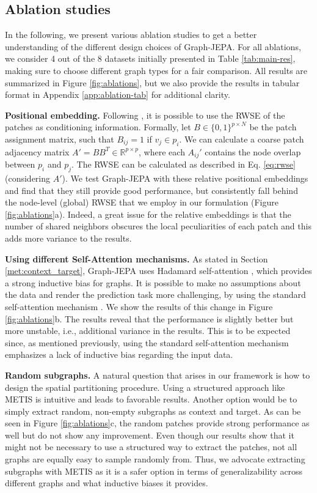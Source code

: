 \documentclass{article} \usepackage{iclr2024_conference,times}
\begin{document}
\subsection{Ablation studies}
In the following, we present various ablation studies to get a better understanding of the different design choices of Graph-JEPA. For all ablations, we consider 4 out of the 8 datasets initially presented in Table \ref{tab:main-res}, making sure to choose different graph types for a fair comparison. All results are summarized in Figure \ref{fig:ablations}, but we also provide the results in tabular format in Appendix \ref{app:ablation-tab} for additional clarity.

\textbf{Positional embedding.} Following \citet{he2023generalization}, it is possible to use the RWSE of the patches as conditioning information. Formally, let $B \in \{0,1\}^{p \times N}$ be the patch assignment matrix, such that $B_{ij} = 1$ if $v_j \in p_i$. We can calculate a coarse patch adjacency matrix $A' = BB^T \in \mathbb{R}^{p \times p}$, where each $A_{ij}'$ contains the node overlap between $p_i$ and $p_j$. The RWSE can be calculated as described in Eq. \ref{eq:rwse} (considering $A'$). We test Graph-JEPA with these relative positional embeddings and find that they still provide good performance, but consistently fall behind the node-level (global) RWSE that we employ in our formulation (Figure \ref{fig:ablations}a). Indeed, a great issue for the relative embeddings is that the number of shared neighbors obscures the local peculiarities of each patch and this adds more variance to the results. 

\textbf{Using different Self-Attention mechanisms.} As stated in Section \ref{met:context_target}, Graph-JEPA uses Hadamard self-attention \citep{he2023generalization}, which provides a strong inductive bias for graphs. It is possible to make no assumptions about the data and render the prediction task more challenging, by using the standard self-attention mechanism \citep{vaswani2017attention}. We show the results of this change in Figure \ref{fig:ablations}b. The results reveal that the performance is slightly better but more unstable, i.e., additional variance in the results. This is to be expected since, as mentioned previously, using the standard self-attention mechanism emphasizes a lack of inductive bias regarding the input data.

\textbf{Random subgraphs.} A natural question that arises in our framework is how to design the spatial partitioning procedure. Using a structured approach like METIS is intuitive and leads to favorable results. Another option would be to simply extract random, non-empty subgraphs as context and target. As can be seen in Figure \ref{fig:ablations}c, the random patches provide strong performance as well but do not show any improvement. Even though our results show that it might not be necessary to use a structured way to extract the patches, not all graphs are equally easy to sample randomly from. Thus, we advocate extracting subgraphs with METIS as it is a safer option in terms of generalizability across different graphs and what inductive biases it provides.
\end{document}
